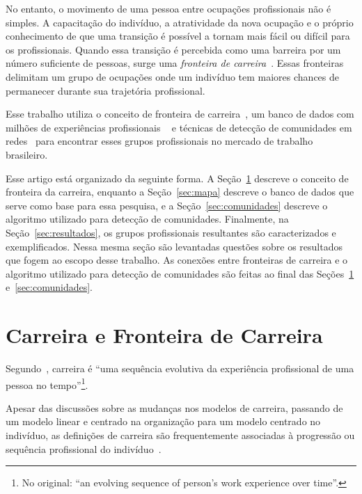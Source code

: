 \documentclass[
  article,
  11pt,
  a4paper,
  english,
  brazil,
  sumario=tradicional]{abntex2}
\begin{document}
No entanto, o movimento de uma pessoa entre ocupações profissionais não é simples. A capacitação do indivíduo, a atratividade da nova ocupação e o próprio conhecimento de que uma transição é possível a tornam mais fácil ou difícil para os profissionais. Quando essa transição é percebida como uma barreira por um número suficiente de pessoas, surge uma \textit{fronteira de carreira}~\cite{Gunz2007-hr}. Essas fronteiras delimitam um grupo de ocupações onde um indivíduo tem maiores chances de permanecer durante sua trajetória profissional.

Esse trabalho utiliza o conceito de fronteira de carreira~\cite{Gunz2007-hr}, um banco de dados com milhões de experiências profissionais ~\cite{VAGAS_Tecnologia2015-yv} e técnicas de detecção de comunidades em redes~\cite{Rosvall2009-sd} para encontrar esses grupos profissionais no mercado de trabalho brasileiro.

Esse artigo está organizado da seguinte forma. A Seção~\ref{sec:carreira} descreve o conceito de fronteira da carreira, enquanto a Seção~\ref{sec:mapa} descreve o banco de dados que serve como base para essa pesquisa, e a Seção~\ref{sec:comunidades} descreve o algoritmo utilizado para detecção de comunidades. Finalmente, na Seção~\ref{sec:resultados}, os grupos profissionais resultantes são caracterizados e exemplificados. Nessa mesma seção são levantadas questões sobre os resultados que fogem ao escopo desse trabalho. As conexões entre fronteiras de carreira e o algoritmo utilizado para detecção de comunidades são feitas ao final das Seções~\ref{sec:carreira} e~\ref{sec:comunidades}.

\section{Carreira e Fronteira de Carreira} \label{sec:carreira}

Segundo~, carreira é \foreignquote{english}{uma sequência evolutiva da experiência profissional de uma pessoa no tempo}\footnote{No original: \enquote{an evolving sequence of person's work experience over time}.}.

Apesar das discussões sobre as mudanças nos modelos de carreira, passando de um modelo linear e centrado na organização para um modelo centrado no indivíduo, as definições de carreira são frequentemente associadas à progressão ou sequência profissional do indivíduo~\cite{Baruch2004-oy,Sullivan2009-xb,Bendassolli2009-bg}.
\end{document}
